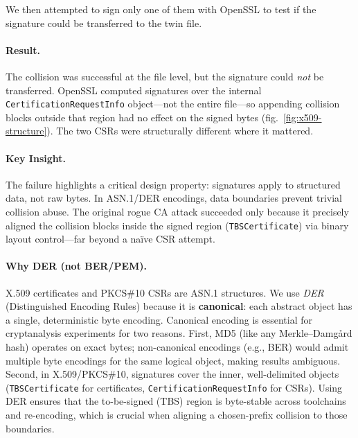 \documentclass[runningheads]{llncs}
\begin{document}
    We then attempted to sign only one of them with OpenSSL to test if the signature could be transferred to the twin file.

    \paragraph{Result.} The collision was successful at the file level, but the signature could \emph{not} be transferred. OpenSSL computed signatures over the internal \texttt{CertificationRequestInfo} object—not the entire file—so appending collision blocks outside that region had no effect on the signed bytes (fig.~\ref{fig:x509-structure}). The two CSRs were structurally different where it mattered.

    \paragraph{Key Insight.} The failure highlights a critical design property: signatures apply to structured data, not raw bytes. In ASN.1/DER encodings, data boundaries prevent trivial collision abuse. The original rogue CA attack succeeded only because it precisely aligned the collision blocks inside the signed region (\texttt{TBSCertificate}) via binary layout control—far beyond a naïve CSR attempt.

    \paragraph{Why DER (not BER/PEM).}
    X.509 certificates and PKCS\#10 CSRs are ASN.1 structures. We use \emph{DER} (Distinguished Encoding Rules) because it is \textbf{canonical}: each abstract object has a single, deterministic byte encoding. Canonical encoding is essential for cryptanalysis experiments for two reasons. First, MD5 (like any Merkle–Damgård hash) operates on exact bytes; non-canonical encodings (e.g., BER) would admit multiple byte encodings for the same logical object, making results ambiguous. Second, in X.509/PKCS\#10, signatures cover the inner, well-delimited objects (\texttt{TBSCertificate} for certificates, \texttt{CertificationRequestInfo} for CSRs). Using DER ensures that the to-be-signed (TBS) region is byte-stable across toolchains and re-encoding, which is crucial when aligning a chosen-prefix collision to those boundaries.
\end{document}

